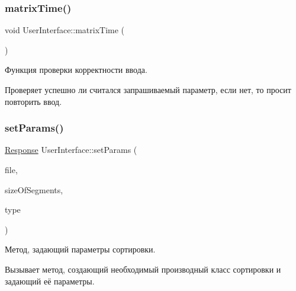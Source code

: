 \subsubsection{\texorpdfstring{matrix\+Time()}{matrixTime()}}
{\footnotesize\ttfamily void User\+Interface\+::matrix\+Time (\begin{DoxyParamCaption}{ }\end{DoxyParamCaption})\hspace{0.3cm}{\ttfamily [private]}}



Функция проверки корректности ввода. 

Проверяет успешно ли считался запрашиваемый параметр, если нет, то просит повторить ввод. \hypertarget{class_user_interface_a50f82c57764069c9fcb7557d835135ff}{}\label{class_user_interface_a50f82c57764069c9fcb7557d835135ff} 
\subsubsection{\texorpdfstring{set\+Params()}{setParams()}}
{\footnotesize\ttfamily \hyperlink{_structures_8h_ab3500e5d3c915d1b5cc58dcab8673fd4}{Response} User\+Interface\+::set\+Params (\begin{DoxyParamCaption}\item[{\hyperlink{class_file_manager}{File\+Manager} $\ast$}]{file,  }\item[{long long}]{size\+Of\+Segments,  }\item[{\hyperlink{_structures_8h_adbb15722785daaf5166f7ea34323854c}{Type\+Of\+Sort}}]{type }\end{DoxyParamCaption})\hspace{0.3cm}{\ttfamily [private]}}



Метод, задающий параметры сортировки. 

Вызывает метод, создающий необходимый производный класс сортировки и задающий её параметры.


